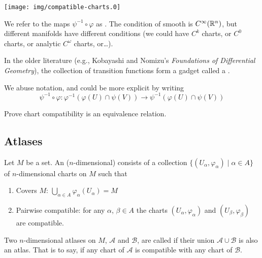 \begin{center}
\texttt{[image: img/compatible-charts.0]}
\end{center}

\begin{remark}
  We refer to the maps $\psi^{-1}\circ\varphi$ as .
  The condition of smooth is $C^{\infty}(\mathbb{R}^{n})$, but different
  manifolds have different conditions (we could have $C^{k}$ charts, or
  $C^{0}$ charts, or analytic $C^{\omega}$ charts, or\dots).

  In the older literature (e.g., Kobayashi and Nomizu's
  \emph{Foundations of Differential Geometry}), the collection of
  transition functions form a gadget called a .
\end{remark}

\begin{remark}
  We abuse notation, and could be more explicit by writing
  \begin{equation}
    \psi^{-1}\circ\varphi\colon\varphi^{-1}(\varphi(U)\cap\psi(V))\to\psi^{-1}(\varphi(U)\cap\psi(V))
  \end{equation}
\end{remark}

\begin{exercise}
  Prove chart compatibility is an equivalence relation.
\end{exercise}

\subsection{Atlases}

\begin{definition}
  Let $M$ be a set. An ($n$-dimensional)  consists of a
  collection $\{(U_{\alpha},\varphi_{\alpha})\mid\alpha\in A\}$ of
  $n$-dimensional charts on $M$ such that
  \begin{enumerate}
  \item Covers $M$: $\bigcup_{\alpha\in A}\varphi_{\alpha}(U_{\alpha})=M$
  \item Pairwise compatible: for any $\alpha$, $\beta\in A$ the charts
    $(U_{\alpha},\varphi_{\alpha})$ and $(U_{\beta},\varphi_{\beta})$
    are compatible.
  \end{enumerate}
\end{definition}

\begin{definition}
  Two $n$-dimensional atlases on $M$, $\mathcal{A}$ and $\mathcal{B}$,
  are called  if their union $\mathcal{A}\cup\mathcal{B}$
  is also an atlas. That is to say, if any chart of $\mathcal{A}$ is
  compatible with any chart of $\mathcal{B}$.
\end{definition}

